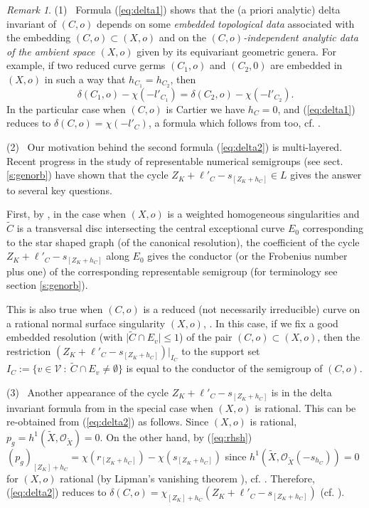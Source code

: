 \documentclass[12pt,a4paper]{amsart}
\def\V{{\mathcal V}}
\def\cO{\mathcal{O}}
\theoremstyle{remark}
\newtheorem{rem}{Remark}[section]
\theoremstyle{definition}
\begin{document}
\begin{rem}\label{rem:delta} 
(1) \ Formula (\ref{eq:delta1}) shows that the (a priori analytic) delta invariant of $(C,o)$ depends on some {\it embedded topological data} associated with the embedding 
$(C,o)\subset (X,o)$ and on the {\it $(C,o)$-independent analytic  data of the 
ambient space $(X,o)$} given by its equivariant geometric genera. 
For example, if two reduced curve germs $(C_1,o)$ and $(C_2,0)$ are embedded in $(X,o)$ in such a way that 
$h_{C_1}=h_{C_2}$, then 
$$\delta(C_1,o)-\chi(-l'_{C_1})=\delta(C_2,o)-\chi(-l'_{C_2}).$$
In the particular case when $(C,o)$ is Cartier we have  $h_C=0$, and (\ref{eq:delta1}) reduces to $\delta(C,o)=\chi(-l'_C)$, a formula which follows from  \cite{BGdelta} too, cf. \cite[3.4]{delta1}. \vspace{0.2cm}

(2) \  Our motivation behind  the second formula (\ref{eq:delta2})  is multi-layered.  Recent progress in the study of representable numerical semigroups (see sect. \ref{s:genorb}) have shown that the cycle $Z_K+\ell'_C-s_{[Z_K+h_C]}\in L$ 
gives the answer to several key questions. 

First, by \cite{stronglyflat}, in the case when $(X,o)$ is a weighted homogeneous singularities and $\tilde{C}$ is a transversal disc intersecting the central exceptional curve $E_0$  
corresponding to the star shaped graph (of the canonical resolution),  
the coefficient of the cycle $Z_K+\ell'_C-s_{[Z_K+h_C]}$ along $E_0$   gives the conductor (or the Frobenius number plus one) of the corresponding representable semigroup (for terminology see section \ref{s:genorb}).

This is also true when $(C,o)$ is a reduced (not necessarily irreducible) curve on a rational normal surface singularity $(X,o)$, \cite{CLMMN_sgp}. In this case, if we fix a good embedded resolution (with $\vert \tilde C \cap E_v\vert \leq 1$) of the pair $(C,o)\subset (X,o)$, then the restriction $(Z_K+\ell'_C-s_{[Z_K+h_C]})\vert_{I_C}$ to the support set $I_C:=\{v\in \V \ : \ \tilde C \cap E_v\neq\emptyset\}$ is equal to the conductor of the semigroup of $(C,o)$. \vspace{0.2cm}

(3) \ Another  appearance of the cycle 
$Z_K+\ell'_C-s_{[Z_K+h_C]}$ is in the delta invariant formula  from \cite{delta1,delta2} in the special case when $(X,o)$ is rational. This can be re-obtained from 
(\ref{eq:delta2}) as follows. Since $(X,o)$ is rational, 
$p_g=h^1(\tilde X, \cO_{\tilde X})=0$. On the other hand, by (\ref{eq:rhsh}) $(p_g)_{[Z_K]+h_C}=\chi(r_{[Z_K+h_C]})-\chi(s_{[Z_K+h_C]})$ since $h^1(\tilde X,\cO_{\tilde X}(-s_{h_C}))=0$ for $(X,o)$ rational (by Lipman's vanishing theorem \cite{Lipman}), cf. \cite[Prop. 4.3]{delta1}. Therefore, (\ref{eq:delta2}) reduces to $\delta(C,o)=\chi_{[Z_K]+h_C}(Z_K+\ell'_C-s_{[Z_K+h_C]})$ (cf. \cite[Thm. 1.1]{delta1}).
\end{rem}
\end{document}
